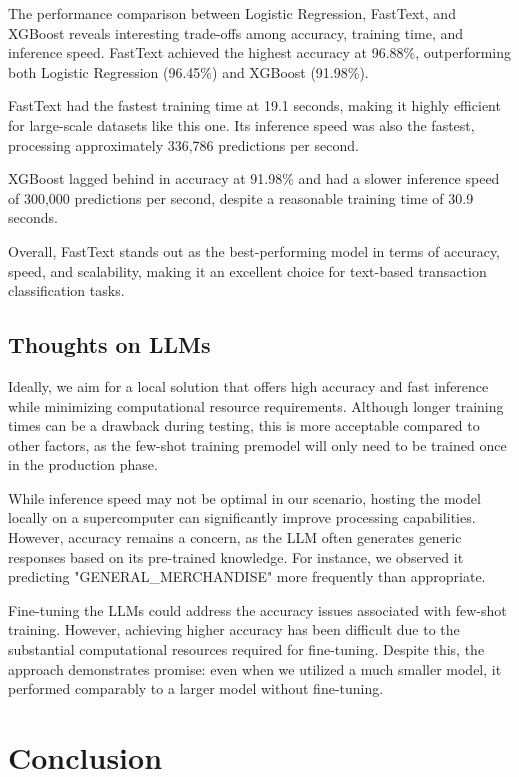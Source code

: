 \documentclass[12pt,letterpaper]{article}
\begin{document}
The performance comparison between Logistic Regression, FastText, and XGBoost reveals interesting trade-offs among accuracy, training time, and inference speed. FastText achieved the highest accuracy at 96.88\%, outperforming both Logistic Regression (96.45\%) and XGBoost (91.98\%).

FastText had the fastest training time at 19.1 seconds, making it highly efficient for large-scale datasets like this one. Its inference speed was also the fastest, processing approximately 336,786 predictions per second.

XGBoost lagged behind in accuracy at 91.98\% and had a slower inference speed of 300,000 predictions per second, despite a reasonable training time of 30.9 seconds.

Overall, FastText stands out as the best-performing model in terms of accuracy, speed, and scalability, making it an excellent choice for text-based transaction classification tasks.


\subsection{Thoughts on LLMs}

Ideally, we aim for a local solution that offers high accuracy and fast inference while minimizing computational resource requirements. Although longer training times can be a drawback during testing, this is more acceptable compared to other factors, as the few-shot training premodel will only need to be trained once in the production phase.

 While inference speed may not be optimal in our scenario, hosting the model locally on a supercomputer can significantly improve processing capabilities. However, accuracy remains a concern, as the LLM often generates generic responses based on its pre-trained knowledge. For instance, we observed it predicting "GENERAL\_MERCHANDISE" more frequently than appropriate.
 
Fine-tuning the LLMs could address the accuracy issues associated with few-shot training. However, achieving higher accuracy has been difficult due to the substantial computational resources required for fine-tuning. Despite this, the approach demonstrates promise: even when we utilized a much smaller model, it performed comparably to a larger model without fine-tuning.


\section{Conclusion}
\end{document}
